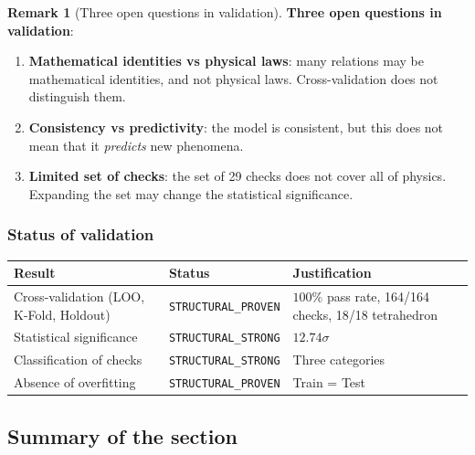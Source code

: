 \documentclass[11pt,a4paper]{article}
\theoremstyle{definition}
\newtheorem{remark}[theorem]{Remark}
\begin{document}
\begin{remark}[Three open questions in validation]
\label{rem:validation-open}
\textbf{Three open questions in validation}:
\begin{enumerate}
    \item \textbf{Mathematical identities vs physical laws}:
          many relations may be mathematical identities,
          and not physical laws. Cross-validation does
          not distinguish them.
    \item \textbf{Consistency vs predictivity}:
          the model is consistent, but this does not mean that it
          \emph{predicts} new phenomena.
    \item \textbf{Limited set of checks}: the set of 29
          checks does not cover all of physics. Expanding
          the set may change the statistical significance.
\end{enumerate}
\end{remark}

\subsubsection{Status of validation}

\begin{center}
\small
\setlength{\tabcolsep}{4pt}
\begin{tabular}{@{}p{5.5cm}p{3.2cm}p{5.8cm}@{}}
\toprule
Result & Status & Justification \\
\midrule
Cross-validation (LOO, K-Fold, Holdout) & \texttt{STRUCTURAL\_PROVEN} &
$100\%$ pass rate, 164/164 checks, 18/18 tetrahedron \\
Statistical significance & \texttt{STRUCTURAL\_STRONG} &
$12.74\sigma$ \\
Classification of checks & \texttt{STRUCTURAL\_STRONG} &
Three categories \\
Absence of overfitting & \texttt{STRUCTURAL\_PROVEN} &
Train = Test \\
\bottomrule
\end{tabular}
\end{center}
\subsection{Summary of the section}
\label{subsec:cv-summary}
\end{document}
